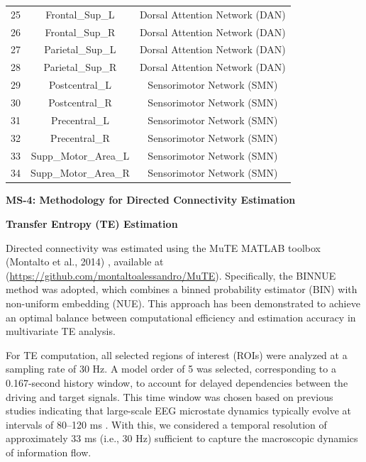 \documentclass[12pt,technote,onecolumn]{IEEEtran}
\begin{document}
\begin{table}[htbp]
\begin{tabular}{ccc}
25 & Frontal\_Sup\_L       & Dorsal Attention Network (DAN) \\
26 & Frontal\_Sup\_R       & Dorsal Attention Network (DAN) \\
27 & Parietal\_Sup\_L      & Dorsal Attention Network (DAN) \\
28 & Parietal\_Sup\_R      & Dorsal Attention Network (DAN) \\
29 & Postcentral\_L        & Sensorimotor Network (SMN) \\
30 & Postcentral\_R        & Sensorimotor Network (SMN) \\
31 & Precentral\_L         & Sensorimotor Network (SMN) \\
32 & Precentral\_R         & Sensorimotor Network (SMN) \\
33 & Supp\_Motor\_Area\_L  & Sensorimotor Network (SMN) \\
34 & Supp\_Motor\_Area\_R  & Sensorimotor Network (SMN) \\
\bottomrule
\end{tabular}
\end{table}



\newpage

\noindent \textbf{MS-4: Methodology for Directed Connectivity Estimation}
\vspace{4mm}

\textbf{Transfer Entropy (TE) Estimation}
\vspace{4mm}

Directed connectivity was estimated using the MuTE MATLAB toolbox (Montalto et al., 2014) \cite{montalto2014mute}, available at (\url{https://github.com/montaltoalessandro/MuTE}). Specifically, the BINNUE method was adopted, which combines a binned probability estimator (BIN) with non-uniform embedding (NUE). This approach has been demonstrated to achieve an optimal balance between computational efficiency and estimation accuracy in multivariate TE analysis.

For TE computation, all selected regions of interest (ROIs) were analyzed at a sampling rate of 30 Hz. A model order of 5 was selected, corresponding to a 0.167-second history window, to account for delayed dependencies between the driving and target signals. This time window was chosen based on previous studies indicating that large-scale EEG microstate dynamics typically evolve at intervals of 80–120 ms \cite{khanna2015microstates}. With this, we considered a temporal resolution of approximately 33 ms (i.e., 30 Hz) sufficient to capture the macroscopic dynamics of information flow.
\end{document}
